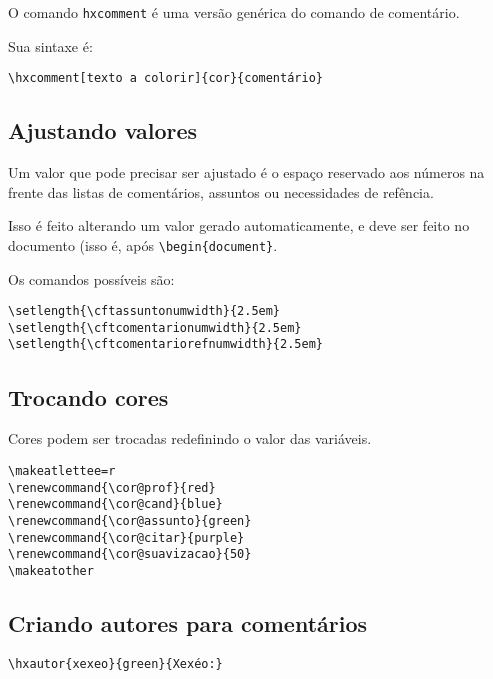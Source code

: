 \documentclass{article}
\begin{document}
O comando \verb!hxcomment! é uma versão genérica do comando de comentário.

Sua sintaxe é:
\begin{verbatim}
\hxcomment[texto a colorir]{cor}{comentário}
\end{verbatim}

\subsection{Ajustando valores}

Um valor que pode precisar ser ajustado é o espaço reservado aos números na frente das listas de comentários, assuntos ou necessidades de refência.

Isso é feito alterando um valor gerado automaticamente, e deve ser feito no documento (isso é, após \verb!\begin{document}!.

Os comandos possíveis são:
\begin{verbatim}
\setlength{\cftassuntonumwidth}{2.5em}
\setlength{\cftcomentarionumwidth}{2.5em}
\setlength{\cftcomentariorefnumwidth}{2.5em}
\end{verbatim}

\subsection{Trocando cores}
Cores podem ser trocadas redefinindo o valor das variáveis.
\begin{verbatim}
\makeatlettee=r
\renewcommand{\cor@prof}{red}
\renewcommand{\cor@cand}{blue}
\renewcommand{\cor@assunto}{green}
\renewcommand{\cor@citar}{purple}
\renewcommand{\cor@suavizacao}{50}
\makeatother
\end{verbatim}

\subsection{Criando autores para comentários}

\begin{verbatim}
\hxautor{xexeo}{green}{Xexéo:}   
\end{verbatim}

\end{document}
